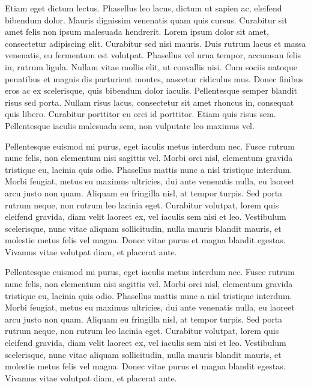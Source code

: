 \documentclass{article}
\begin{document}
 

Etiam eget dictum lectus.
 Phasellus leo lacus, dictum ut sapien ac, eleifend bibendum dolor.
 Mauris dignissim venenatis quam quis cursus.
 Curabitur sit amet felis non ipsum malesuada hendrerit.
 Lorem ipsum dolor sit amet, consectetur adipiscing elit.
 Curabitur sed nisi mauris.
 Duis rutrum lacus et massa venenatis, eu fermentum est volutpat.
 Phasellus vel urna tempor, accumsan felis in, rutrum ligula.
 Nullam vitae mollis elit, ut convallis nisi.
 Cum sociis natoque penatibus et magnis dis parturient montes, nascetur ridiculus mus.
 Donec finibus eros ac ex scelerisque, quis bibendum dolor iaculis.
 Pellentesque semper blandit risus sed porta.
 Nullam risus lacus, consectetur sit amet rhoncus in, consequat quis libero.
 Curabitur porttitor eu orci id porttitor.
 Etiam quis risus sem.
 Pellentesque iaculis malesuada sem, non vulputate leo maximus vel.

 
Pellentesque euismod mi purus, eget iaculis metus interdum nec.
 Fusce rutrum nunc felis, non elementum nisi sagittis vel.
 Morbi orci nisl, elementum gravida tristique eu, lacinia quis odio.
 Phasellus mattis nunc a nisl tristique interdum.
 Morbi feugiat, metus eu maximus ultricies, dui ante venenatis nulla, eu laoreet arcu justo non quam.
 Aliquam eu fringilla nisl, at tempor turpis.
 Sed porta rutrum neque, non rutrum leo lacinia eget.
 Curabitur volutpat, lorem quis eleifend gravida, diam velit laoreet ex, vel iaculis sem nisi et leo.
 Vestibulum scelerisque, nunc vitae aliquam sollicitudin, nulla mauris blandit mauris, et molestie metus felis vel magna.
 Donec vitae purus et magna blandit egestas.
 Vivamus vitae volutpat diam, et placerat ante.
 
 Pellentesque euismod mi purus, eget iaculis metus interdum nec.
 Fusce rutrum nunc felis, non elementum nisi sagittis vel.
 Morbi orci nisl, elementum gravida tristique eu, lacinia quis odio.
 Phasellus mattis nunc a nisl tristique interdum.
 Morbi feugiat, metus eu maximus ultricies, dui ante venenatis nulla, eu laoreet arcu justo non quam.
 Aliquam eu fringilla nisl, at tempor turpis.
 Sed porta rutrum neque, non rutrum leo lacinia eget.
 Curabitur volutpat, lorem quis eleifend gravida, diam velit laoreet ex, vel iaculis sem nisi et leo.
 Vestibulum scelerisque, nunc vitae aliquam sollicitudin, nulla mauris blandit mauris, et molestie metus felis vel magna.
 Donec vitae purus et magna blandit egestas.
 Vivamus vitae volutpat diam, et placerat ante.
 
\end{document}
